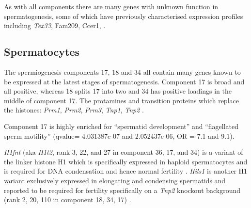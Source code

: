 As with all components there are many genes with unknown function in spermatogenesis, some of which have previously characterised expression profiles including \textit{Tex33}, {Fam209}, {Ccer1},  \parencite{Kwon2017Expression}.


\subsection{Spermatocytes}

The spermiogenesis components 17, 18 and 34 all contain many genes known to be expressed at the latest stages of spermatogenesis. Component 17 is broad and all positive, whereas 18 splits 17 into two and 34 has positive loadings in the middle of component 17. The protamines and transition proteins which replace the histones: \textit{Prm1}, \textit{Prm2}, \textit{Prm3}, \textit{Tnp1}, \textit{Tnp2} \parencite{Sassone-Corsi2002Unique}. 

Component 17 is highly enriched for ``spermatid development'' and ``flagellated sperm motility'' (qvalue= 4.031387e-07 and 2.052437e-06, OR = 7.1 and 9.1).

\textit{H1fnt} (aka \textit{H1t2}, rank 3, 22, and 27 in component 36, 17, and 34) is a variant of the linker histone H1 which is specifically expressed in haploid spermatocytes and is required for DNA condensation and hence normal fertility \parencite{Martianov2005Polar, Tanaka2005HANP1}. \textit{Hils1} is another H1 variant exclusively expressed in elongating and condensing spermatids and reported to be required for fertility specifically on a \textit{Tnp2} knockout background (rank 2, 20, 110 in component 18, 34, 17) \parencite{Yan2003HILS1, Wu2009Genetic}.

